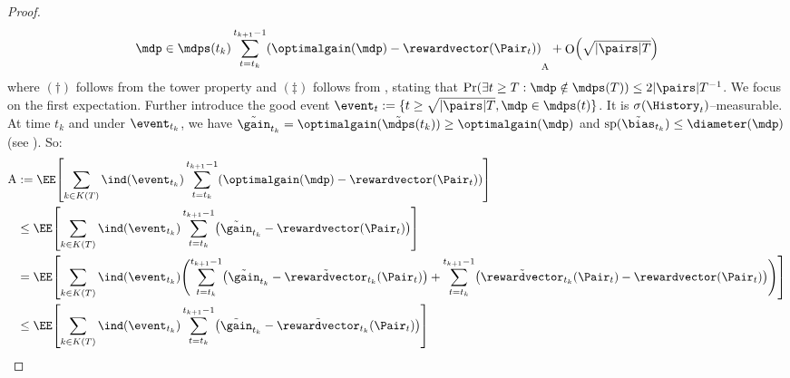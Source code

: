 \documentclass[preprint,cleveref,12pt]{colt2025}
\DeclarePairedDelimiter{\braces}{\{}{\}}	%
\DeclarePairedDelimiter{\brackets}{[}{]}	%
\DeclarePairedDelimiter{\parens}{(}{)}	%
\DeclarePairedDelimiter{\abs}{\lvert}{\rvert}	%
\newcommand{\tsqrt}[1]{{\textstyle\sqrt{#1}}} %
\newcommand{\indic}[1]{\ind\parens{#1}}
\def\indicator{\indic}
\newcommand{\vecspan}[1]{\mathrm{sp}\parens{#1}}
\DeclareMathOperator*{\OH}{\mathrm{O}}
\def\model{\mdp}
\def\models{\mdps}
\def\reward{\rewardvector}
\def\optgain{\optimalgain} %
\begin{document}
\begin{proof}
\begin{align*}
{{{                        \model \in \models(t_k)
                    }
                    \sum_{t = t_k}^{t_{k+1} - 1}
                    (\optgain(\model) - \reward(\Pair_t))
                }
            }_{\mathrm{A}}
            + \OH\parens*{\tsqrt{\abs{\pairs}T}}
        \end{align*}
        where 
        $(\dagger)$ follows from the tower property and
        $(\ddagger)$ follows from , stating that $\Pr(\exists t \ge T: \model \notin \models(T)) \le 2 \abs{\pairs} T^{-1}$. 
        We focus on the first expectation.
        Further introduce the good event $\event_t := \braces{t \ge \sqrt{\abs{\pairs} T}, \model \in \models(t)}$.
        It is $\sigma(\History_t)$--measurable.
        At time $t_k$ and under $\event_{t_k}$, we have $\tilde{\gain}_{t_k} = \optgain(\tilde{\models}(t_k)) \ge \optgain(\model)$ and $\vecspan{\tilde{\bias}_{t_k}} \le \diameter(\model)$ (see ). 
        So:
        \begin{align*}
            \mathrm{A} 
            & :=
            \EE \brackets*{
                \sum_{k \in K(T)}
                \indicator{\event_{t_k}}
                \sum_{t = t_k}^{t_{k+1} - 1}
                (\optgain(\model) - \reward(\Pair_t))
            }
            \\
            & \le 
            \EE \brackets*{
                \sum_{k \in K(T)}
                \indicator{\event_{t_k}}
                \sum_{t = t_k}^{t_{k+1} - 1}
                \parens*{
                    \tilde{\gain}_{t_k} - \reward(\Pair_t)
                }
            }
            \\
            & = 
            \EE \brackets*{
                \sum_{k \in K(T)}
                \indicator{\event_{t_k}}
                \parens*{
                    \sum_{t = t_k}^{t_{k+1} - 1}
                    \parens*{
                        \tilde{\gain}_{t_k} - \tilde{\reward}_{t_k}(\Pair_t)
                    }
                    +
                    \sum_{t = t_k}^{t_{k+1} - 1}
                    \parens*{
                        \tilde{\reward}_{t_k}(\Pair_t)
                        -
                        \reward(\Pair_t)
                    }
                }
            }
            \\
            & \le
            \EE \brackets*{
                \sum_{k \in K(T)}
                \indicator{\event_{t_k}}
                \sum_{t = t_k}^{t_{k+1} - 1}
                \parens*{
                    \tilde{\gain}_{t_k} - \tilde{\reward}_{t_k}(\Pair_t)
}}
\end{align*}
\end{proof}
\end{document}
